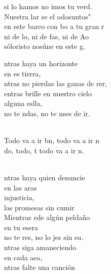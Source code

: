 \documentclass[12pt]{article}
\begin{document}
\begin{multicols*}{2}
\begin{cancion}
	si lo hamos no imos tu verd.\\
	Nuestra lar se el odosuntos"\\
	en este barco con bo a tu gran r\\
	ni de lo, ni de fas, ni de Ao\\
	sóloristo nosúne en este g.\\
\end{cancion}%

\begin{cancion}%
	ntras haya un horizonte \\
	en es tierra,\\
	ntras no pierdas las ganas de rer,\\
	entras brille en nuestro cielo\\
	alguna eslla,\\
	no te ndas, no te nses de ir.\\\jump\\
	\begin{chorus}%
	Todo va a ir bn, todo va a ir n\\
	do, todo, t todo va a ir n.\\
	\end{chorus}%
	\jump\\
	ntras haya quien denuncie \\
	en las aras\\
	injusticia, \\
	las promesas sin cumir\\
	Mientras ede algún peldaño \\
	en tu esera\\
	no te res, no lo jes sin su.\\
	ntras siga amaneciendo\\
	en cada aea,\\
	ntras falte una canción\\

\end{cancion}
\end{multicols*}
\end{document}
